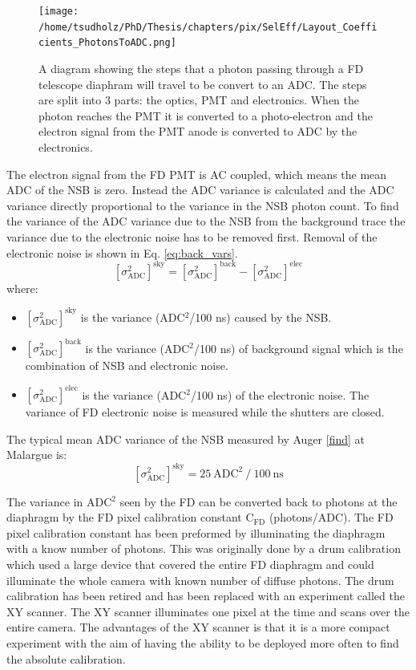 \begin{figure}
\centering
\texttt{[image: /home/tsudholz/PhD/Thesis/chapters/pix/SelEff/Layout\_Coefficients\_PhotonsToADC.png]}
\caption{A diagram showing the steps that a photon passing through a FD telescope diaphram will travel to be convert to an ADC. The steps are split into 3 parts: the optics, PMT and electronics. When the photon reaches the PMT it is converted to a photo-electron and the electron signal from the PMT anode is converted to ADC by the electronics.} \label{fig:FD_CoefficientLayout_PhotonToADC}
\end{figure}
  
The electron signal from the FD PMT is AC coupled, which means the mean ADC of the NSB is zero. Instead the ADC variance is calculated and the ADC variance directly proportional to the variance in the NSB photon count. To find the variance of the ADC variance due to the NSB from the background trace the variance due to the electronic noise has to be removed first. Removal of the electronic noise is shown in Eq. \ref{eq:back_vars}. 
\begin{equation}
\left[\sigma^2_{\mathrm{ADC}}\right]^{\mathrm{sky}} = \left[\sigma^2_{\mathrm{ADC}}\right]^{\mathrm{back}} - \left[\sigma^2_{\mathrm{ADC}}\right]^{\mathrm{elec}} \label{eq:back_vars}
\end{equation} 
where:
\begin{itemize}
\item[] $\left[\sigma^2_{\mathrm{ADC}}\right]^{\mathrm{sky}}$ is the variance (ADC$^2$/100 ns) caused by the NSB.
\item[] $\left[\sigma^2_{\mathrm{ADC}}\right]^{\mathrm{back}}$ is the variance (ADC$^2$/100 ns) of background signal which is the combination of NSB and electronic noise.
\item[] $\left[\sigma^2_{\mathrm{ADC}}\right]^{\mathrm{elec}}$ is the variance (ADC$^2$/100 ns) of the electronic noise. The variance of FD electronic noise is measured while the shutters are closed.
\end{itemize}
The typical mean ADC variance of the NSB measured by Auger \ref{find} at Malargue is:
\begin{equation}
\left[\sigma^2_{\mathrm{ADC}}\right]^{\mathrm{sky}} = 25 \ \mathrm{ADC}^2 \ / \ 100 \ \mathrm{ns} \nonumber
\end{equation}

The variance in ADC$^2$ seen by the FD can be converted back to photons at the diaphragm by the FD pixel calibration constant C$_{\mathrm{FD}}$ (photons/ADC). The FD pixel calibration constant has been preformed by illuminating the diaphragm with a know number of photons. This was originally done by a drum calibration which used a large device that covered the entire FD diaphragm and could illuminate the whole camera with known number of diffuse photons. The drum calibration has been retired and has been replaced with an experiment called the XY scanner. The XY scanner illuminates one pixel at the time and scans over the entire camera. The advantages of the XY scanner is that it is a more compact experiment with the aim of having the ability to be deployed more often to find the absolute calibration.

